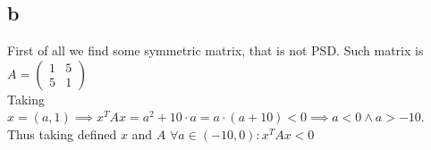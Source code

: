 \subsection*{b}
First of all we find some symmetric matrix, that is not PSD. Such matrix is\\
$A = \left(
\begin{matrix}
	1 & 5\\
	5 & 1
\end{matrix}	
\right)$\\
Taking $x = (a, 1) \implies x^TAx = a^2 + 10\cdot a =  a\cdot(a + 10) < 0 \implies a < 0 \land a > -10$.\\
Thus taking defined $x$ and $A$ $\forall a \in (-10, 0) : x^TAx < 0$